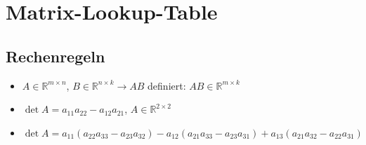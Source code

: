 \documentclass[german, fourcolumn, 8pt]{latex4ei/latex4ei_sheet}
\begin{document}
\section{Matrix-Lookup-Table}
\begin{sectionbox}
    \subsection{Rechenregeln}
    \begin{itemize}
        \item $A \in \mathbb R^{m \times n}$, $B \in \mathbb R^{n\times k} \rightarrow AB$ definiert: $AB \in \mathbb R^{m \times k}$
        \item $\det A = a_{11}a_{22}-a_{12}a_{21}$, $A \in \mathbb R^{2\times 2}$
        \item $\det A = a_{11}(a_{22}a_{33}-a_{23}a_{32})-a_{12}(a_{21}a_{33}-a_{23}a_{31})+a_{13}(a_{21}a_{32}-a_{22}a_{31})$
    \end{itemize}
\end{sectionbox}
\end{document}
